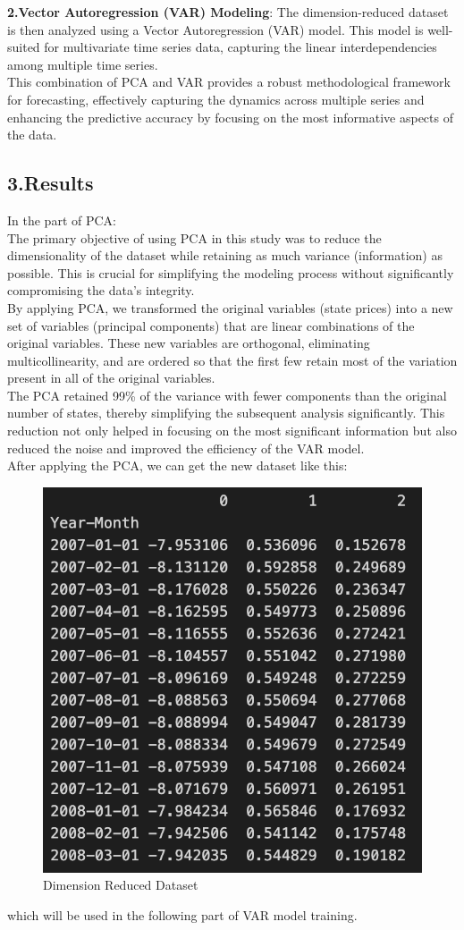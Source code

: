 \documentclass[12pt]{article}
\begin{document}
\textbf{2.Vector Autoregression (VAR) Modeling}: The dimension-reduced dataset is then analyzed using a Vector Autoregression (VAR) model. This model is well-suited for multivariate time series data, capturing the linear interdependencies among multiple time series.\\

This combination of PCA and VAR provides a robust methodological framework for forecasting, effectively capturing the dynamics across multiple series and enhancing the predictive accuracy by focusing on the most informative aspects of the data.

\subsection*{3.Results}
In the part of PCA:\\
The primary objective of using PCA in this study was to reduce the dimensionality of the dataset while retaining as much variance (information) as possible. This is crucial for simplifying the modeling process without significantly compromising the data's integrity.\\
By applying PCA, we transformed the original variables (state prices) into a new set of variables (principal components) that are linear combinations of the original variables. These new variables are orthogonal, eliminating multicollinearity, and are ordered so that the first few retain most of the variation present in all of the original variables.\\
The PCA retained 99\% of the variance with fewer components than the original number of states, thereby simplifying the subsequent analysis significantly. This reduction not only helped in focusing on the most significant information but also reduced the noise and improved the efficiency of the VAR model.\\
After applying the PCA, we can get the new dataset like this:
\begin{figure}[H]
    \centering
    \includegraphics[width=0.5\linewidth]{PCA.png}
    \caption*{Dimension Reduced Dataset}
\end{figure}
which will be used in the following part of VAR model training.\\
\end{document}
